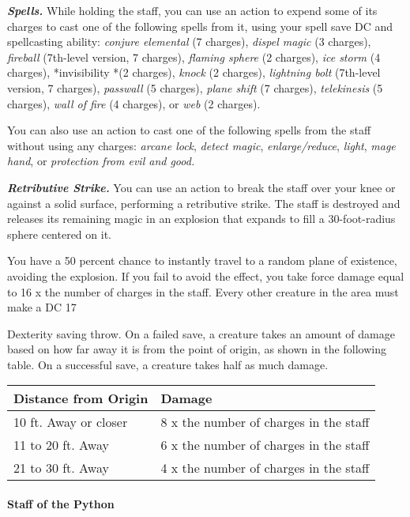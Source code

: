 \documentclass[
]{article}
\begin{document}
\emph{\textbf{Spells.}} While holding the staff, you can use an action
to expend some of its charges to cast one of the following spells from
it, using your spell save DC and spellcasting ability: \emph{conjure
elemental} (7 charges), \emph{dispel magic} (3 charges), \emph{fireball}
(7th-level version, 7 charges), \emph{flaming sphere} (2 charges),
\emph{ice storm} (4 charges), *invisibility *(2 charges), \emph{knock}
(2 charges), \emph{lightning bolt} (7th-level version, 7 charges),
\emph{passwall} (5 charges), \emph{plane shift} (7 charges),
\emph{telekinesis} (5 charges), \emph{wall of fire} (4 charges), or
\emph{web} (2 charges).

You can also use an action to cast one of the following spells from the
staff without using any charges: \emph{arcane lock}, \emph{detect
magic}, \emph{enlarge/reduce}, \emph{light}, \emph{mage hand}, or
\emph{protection from evil and good.}

\emph{\textbf{Retributive Strike.}} You can use an action to break the
staff over your knee or against a solid surface, performing a
retributive strike. The staff is destroyed and releases its remaining
magic in an explosion that expands to fill a 30-foot-radius sphere
centered on it.

You have a 50 percent chance to instantly travel to a random plane of
existence, avoiding the explosion. If you fail to avoid the effect, you
take force damage equal to 16 x the number of charges in the staff.
Every other creature in the area must make a DC 17

Dexterity saving throw. On a failed save, a creature takes an amount of
damage based on how far away it is from the point of origin, as shown in
the following table. On a successful save, a creature takes half as much
damage.

\begin{longtable}[]{@{}ll@{}}
\toprule
Distance from Origin & Damage\tabularnewline
\midrule
\endhead
10 ft. Away or closer & 8 x the number of charges in the
staff\tabularnewline
11 to 20 ft. Away & 6 x the number of charges in the
staff\tabularnewline
21 to 30 ft. Away & 4 x the number of charges in the
staff\tabularnewline
\bottomrule
\end{longtable}

\hypertarget{staff-of-the-python}{%
\paragraph{Staff of the Python}\label{staff-of-the-python}}
\end{document}
